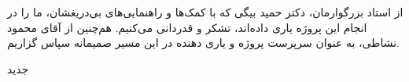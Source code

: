 

\begin{center}
\end{center}

از استاد بزرگوارمان، دکتر حمید بیگی که با کمک‌ها و راهنمایی‌های بی‌دریغشان، ما را در انجام این پروژه یاری داده‌اند، تشکر و قدردانی می‌کنیم.
هم‌چنین از آقای محمود نشاطی، به عنوان سرپرست پروژه و یاری دهنده در این مسیر صمیمانه سپاس گزاریم.

‌جدید
